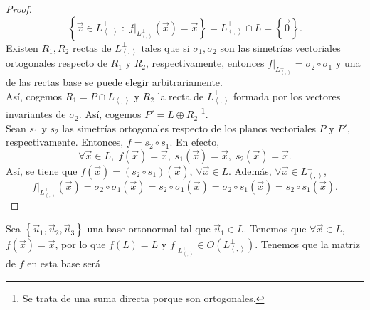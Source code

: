 \begin{description}
\begin{proof}
	\[ \left\{ \vec{x} \in L^{\perp }_{\left\langle ,  \right\rangle } \; : \; f|_{L^{\perp }_{\left\langle ,  \right\rangle }}\left(\vec{x}\right) = \vec{x}\right\} = L^{\perp }_{\left\langle ,  \right\rangle }\cap L = \left\{ \vec{0}\right\}.\]
	Existen $\displaystyle R_{1}, R_{2} $ rectas de $\displaystyle L^{\perp }_{\left\langle ,  \right\rangle } $ tales que si $\displaystyle \sigma_{1}, \sigma_{2} $ son las simetrías vectoriales ortogonales respecto de $\displaystyle R_{1} $ y $\displaystyle R_{2} $, respectivamente, entonces $\displaystyle f|_{L^{\perp }_{\left\langle ,  \right\rangle }} = \sigma_{2}\circ\sigma_{1} $ y una de las rectas base se puede elegir arbitrariamente.\\ 
	Así, cogemos $\displaystyle R_{1} = P \cap L^{\perp }_{\left\langle ,  \right\rangle } $ y $\displaystyle R_{2} $ la recta de $\displaystyle L^{\perp }_{\left\langle ,  \right\rangle } $ formada por los vectores invariantes de $\displaystyle \sigma_{2} $. Así, cogemos $\displaystyle P'= L \oplus R_{2} $ \footnote{Se trata de una suma directa porque son ortogonales.}. \\ 
	Sean $\displaystyle s_{1} $ y $\displaystyle s_{2} $ las simetrías ortogonales respecto de los planos vectoriales $\displaystyle P $ y $\displaystyle P' $, respectivamente. Entonces, $\displaystyle f = s_{2}\circ s_{1} $. En efecto,
	\[\forall \vec{x} \in L, \; f\left(\vec{x}\right) = \vec{x}, \; s_{1}\left(\vec{x}\right)= \vec{x}, \; s_{2}\left(\vec{x}\right) = \vec{x} .\]
	Así, se tiene que $\displaystyle f\left(\vec{x}\right) = \left(s_{2}\circ s_{1}\right)\left(\vec{x}\right) $, $\displaystyle \forall \vec{x} \in L $. Además, $\displaystyle \forall \vec{x} \in L^{\perp }_{\left\langle ,  \right\rangle } $,
	\[f|_{L^{\perp }_{\left\langle ,  \right\rangle }}\left(\vec{x}\right) = \sigma_{2}\circ\sigma_{1}\left(\vec{x}\right) = s_{2}\circ \sigma_{1}\left(\vec{x}\right) = \sigma_{2}\circ s_{1}\left(\vec{x}\right) = s _{2} \circ s_{1}\left(\vec{x}\right) .\]
	\end{proof}
\begin{observation}
	\normalfont Sea $\displaystyle \left\{ \vec{u}_{1}, \vec{u}_{2}, \vec{u}_{3}\right\}  $ una base ortonormal tal que $\displaystyle \vec{u}_{1} \in L $. Tenemos que $\displaystyle \forall \vec{x} \in L $, $\displaystyle f\left(\vec{x}\right) = \vec{x} $, por lo que $\displaystyle f\left(L\right) = L $ y $\displaystyle f|_{L^{\perp }_{\left\langle ,  \right\rangle }} \in O\left(L^{\perp }_{\left\langle ,  \right\rangle }\right)$. Tenemos que la matriz de $\displaystyle f $ en esta base será

\end{observation}
\end{description}
